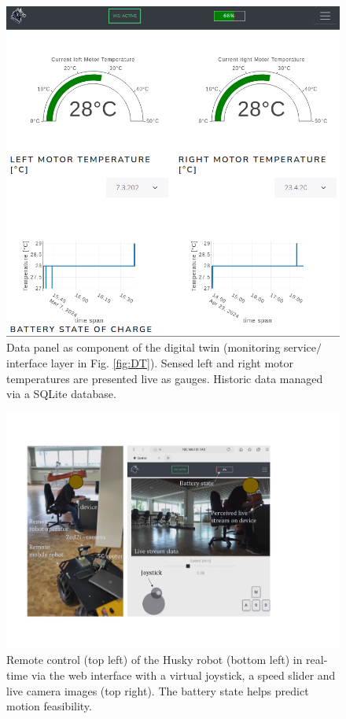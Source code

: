 \documentclass[letterpaper, 10 pt, conference]{ieeeconf}  %
\begin{document}
\begin{figure}[b]
	\centerline{\includegraphics[width=0.9\columnwidth]{images/tabletdatasm.png}}
	\caption{Data panel as component of the digital twin (monitoring service$\slash$interface layer in Fig. \ref{fig:DT}). Sensed left and right motor temperatures are presented live as gauges. Historic data managed via a SQLite database.}
	\label{fig:overviewplots}
\end{figure}
\begin{figure}[b]
	\centerline{\includegraphics[width=\columnwidth]{images/telehusky.pdf}}
	\caption{Remote control (top left) of the Husky robot (bottom left) in real-time via the web interface with a virtual joystick, a speed slider and  live camera images (top right). The battery state helps predict motion feasibility.}
	\label{fig:clip}
\end{figure}
\end{document}
